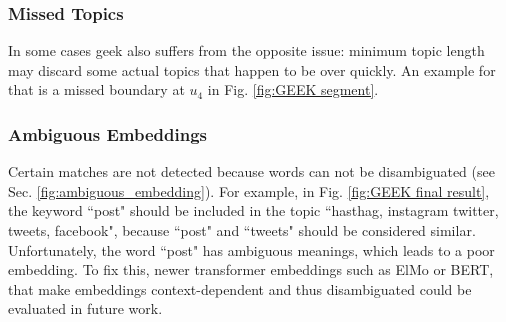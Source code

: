     \subsubsection{Missed Topics}
        In some cases \gls{geek} also suffers from the opposite issue: minimum topic length may discard some actual topics that happen to be over quickly. An example for that is a missed boundary at $u_4$ in Fig. \ref{fig:GEEK segment}.

    \subsubsection{Ambiguous Embeddings}
        Certain matches are not detected because words can not be disambiguated (see Sec. \ref{fig:ambiguous_embedding}). For example, in Fig. \ref{fig:GEEK final result}, the keyword ``post" should be included in the topic ``hasthag, instagram twitter, tweets, facebook", because ``post" and ``tweets" should be considered similar. Unfortunately, the word ``post" has ambiguous meanings, which leads to a poor embedding. To fix this, newer transformer \glspl{embedding} such as ElMo\cite{peters2018elmo} or BERT\cite{devlin2018bert}, that make \glspl{embedding} context-dependent and thus disambiguated could be evaluated in future work. \newline
